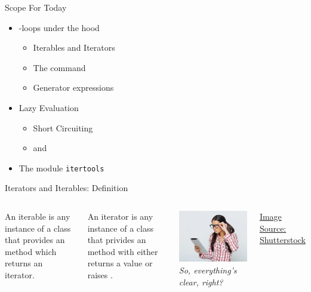 \begin{frame}{Scope For Today}
%
\begin{itemize}
\item {}-loops under the hood
	\begin{itemize}
	\item Iterables and Iterators
	\item The command 
	\item Generator expressions
	\end{itemize}
\item Lazy Evaluation
	\begin{itemize}
	\item Short Circuiting
	\item {} and 
	\end{itemize}
\item The module \texttt{itertools}
\end{itemize}
%
\end{frame}


\begin{frame}[fragile]{Iterators and Iterables: Definition}
%
\begin{columns}
\begin{defbox}[Iterable]
An iterable is any instance of a class that provides an  method which returns an iterator.
\end{defbox}
%
\begin{defbox}[Iterator]
An iterator is any instance of a class that privides an  method with either returns a value or raises .
\end{defbox}
%
\includegraphics[width=\linewidth]{./gfx/08-geek}
\emph{So, everything's clear, right?}

\vspace{6pt}
\begin{flushright}
\tiny
\href{https://www.shutterstock.com/image-photo/beautiful-geek-woman-holding-digital-tablet-421481161}{Image Source: Shutterstock}
\end{flushright}
\end{columns}
%
\end{frame}


